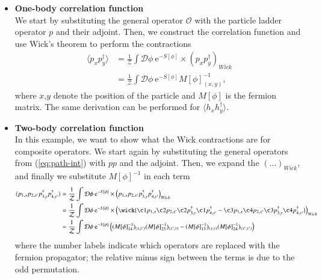\begin{itemize}
    \item \textbf{One-body correlation function}\\
    We start by substituting the general operator $\mathcal{O}$ with the particle ladder operator $p$ and their adjoint. Then, we construct the correlation function and use Wick's theorem to perform the contractions
    \begin{equation}
        \begin{aligned}
            \langle p_{x}p^\dagger_{y} \rangle &= \frac{1}{\mathcal{Z}} \int \mathcal{D}\phi \:\mathrm{e}^{-S[\phi]}\times \left(p_{x}p^\dagger_{y}\right)_{Wick} 
            \\
            &= \frac{1}{\mathcal{Z}} \int \mathcal{D}\phi \:\mathrm{e}^{-S[\phi]} M[\phi]^{-1}_{(x,y)},
        \end{aligned}
    \end{equation}
    where $x$,$y$ denote the position of the particle and $M[\phi]$ is the fermion matrix. The same derivation can be performed for $\langle h_xh^\dagger_y\rangle$.
    
    \item \textbf{Two-body correlation function}\\
    In this example, we want to show what the Wick contractions are for composite operators. We start again by substituting the general operators from (\cref{eq:path-int}) with $pp$ and the adjoint. Then, we expand the $\left(\dots\right)_{Wick}$, and finally we substitute $M[\phi]^{-1}$ in each term
    \begin{equation}
        \begin{aligned}
            \langle p_{1,x}p_{2,x'}p^\dagger_{3,y}p^\dagger_{4,y'} \rangle &= \frac{1}{\mathcal{Z}} \int \mathcal{D}\phi \:\mathrm{e}^{-S[\phi]}\times \left(p_{1,x}p_{2,x'}p^\dagger_{3,y}p^\dagger_{4,y'}\right)_{Wick} 
            \\
            &= \frac{1}{\mathcal{Z}} \int \mathcal{D}\phi \:\mathrm{e}^{-S[\phi]}\times \left(\wick{\c1 p_{1,x} \c2 p_{2,x'} \c2 p^\dagger_{3,y} \c1 p^\dagger_{4,y'} - \c3 p_{1,x} \c4 p_{2,x'} \c3 p^\dagger_{3,y} \c4 p^\dagger_{4,y'}}\right)_{Wick} 
            \\
            &= \frac{1}{\mathcal{Z}} \int \mathcal{D}\phi \:\mathrm{e}^{-S[\phi]} \left((M[\phi]^{-1}_{14})_{(x,y')}(M[\phi]^{-1}_{23})_{(x',y)} - (M[\phi]^{-1}_{13})_{(x,y)}(M[\phi]^{-1}_{24})_{(x',y')}\right)
        \end{aligned}
    \end{equation}
    where the number labels indicate which operators are replaced with the fermion propagator; the relative minus sign between the terms is due to the odd permutation.


\end{itemize}
